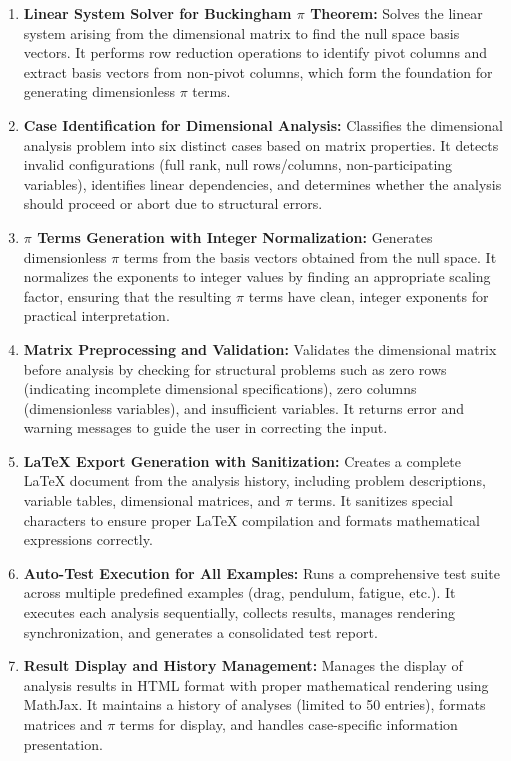 \documentclass[
	11pt, %
	fleqn, %
	a4paper, %
]{LegrandOrangeBook}
\begin{document}
\begin{enumerate}
    \item \textbf{Linear System Solver for Buckingham $\pi$ Theorem:} Solves the linear system arising from the dimensional matrix to find the null space basis vectors. It performs row reduction operations to identify pivot columns and extract basis vectors from non-pivot columns, which form the foundation for generating dimensionless $\pi$ terms.

    \item \textbf{Case Identification for Dimensional Analysis:} Classifies the dimensional analysis problem into six distinct cases based on matrix properties. It detects invalid configurations (full rank, null rows/columns, non-participating variables), identifies linear dependencies, and determines whether the analysis should proceed or abort due to structural errors.

    \item \textbf{$\pi$ Terms Generation with Integer Normalization:} Generates dimensionless $\pi$ terms from the basis vectors obtained from the null space. It normalizes the exponents to integer values by finding an appropriate scaling factor, ensuring that the resulting $\pi$ terms have clean, integer exponents for practical interpretation.

    \item \textbf{Matrix Preprocessing and Validation:} Validates the dimensional matrix before analysis by checking for structural problems such as zero rows (indicating incomplete dimensional specifications), zero columns (dimensionless variables), and insufficient variables. It returns error and warning messages to guide the user in correcting the input.

    \item \textbf{LaTeX Export Generation with Sanitization:} Creates a complete LaTeX document from the analysis history, including problem descriptions, variable tables, dimensional matrices, and $\pi$ terms. It sanitizes special characters to ensure proper LaTeX compilation and formats mathematical expressions correctly.

    \item \textbf{Auto-Test Execution for All Examples:} Runs a comprehensive test suite across multiple predefined examples (drag, pendulum, fatigue, etc.). It executes each analysis sequentially, collects results, manages rendering synchronization, and generates a consolidated test report.

    \item \textbf{Result Display and History Management:} Manages the display of analysis results in HTML format with proper mathematical rendering using MathJax. It maintains a history of analyses (limited to 50 entries), formats matrices and $\pi$ terms for display, and handles case-specific information presentation.
\end{enumerate}
\end{document}
